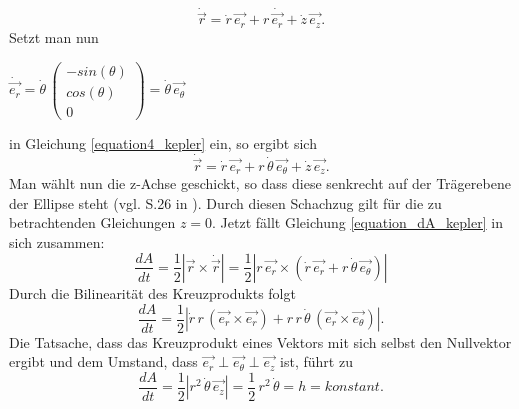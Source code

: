 \begin{equation}
	\dot{\vec{r}} = \dot{r}\,\vec{e_r} + r\,\dot{\vec{e_r}} + \dot{z}\,\vec{e_z}.
	\label{equation4_kepler}
\end{equation}
\newpage
Setzt man nun   
\begin{center}	
	\ensuremath{\dot{\vec{e_{r}}}=\dot{\theta}\,\left(\begin{array}{c}-sin(\theta)\\ cos(\theta)\\0\end{array}\right)=\dot{\theta}\,\vec{e_{\theta}}}
\end{center}
in Gleichung \ref{equation4_kepler} ein, so ergibt sich  
\begin{equation}
\dot{\vec{r}} = \dot{r}\,\vec{e_r} + r\,\dot{\theta}\,\vec{e_{\theta}} + \dot{z}\,\vec{e_z}.
\label{equation5_kepler}
\end{equation}
Man wählt nun die z-Achse geschickt, so dass diese senkrecht auf der Trägerebene der Ellipse steht (vgl. S.26 in \cite{Raumflugm}). Durch diesen Schachzug gilt für die zu betrachtenden Gleichungen \ensuremath{z=0}. Jetzt fällt Gleichung \ref{equation_dA_kepler} in sich zusammen:
\begin{equation}
\frac{dA}{dt} = \frac{1}{2}\left| \vec{r} \times \dot{\vec{r}} \right| = \frac{1}{2}\left| r\,\vec{e_r} \times \left(\dot{r}\,\vec{e_r} + r\,\dot{\theta}\,\vec{e_{\theta}}\right) \right|
\end{equation}  
Durch die Bilinearität des Kreuzprodukts folgt
\begin{equation}
\frac{dA}{dt} = \frac{1}{2}\left| \dot{r}\,r\,\left(\vec{e_r} \times \vec{e_r}\right) + r\,r\,\dot{\theta}\,\left(\vec{e_r} \times \vec{e_{\theta}}\right) \right|.
\end{equation}
Die Tatsache, dass das Kreuzprodukt eines Vektors mit sich selbst den Nullvektor ergibt und dem Umstand, dass \ensuremath{\vec{e_r}\perp\vec{e_\theta}\perp\vec{e_z}} ist, führt zu
\begin{equation}
\frac{dA}{dt} = \frac{1}{2}\left|r^2\,\dot{\theta}\,\vec{e_z} \right| =  \frac{1}{2}\,r^2\,\dot{\theta}=h=konstant.
\label{equation6_kepler}
\end{equation}

